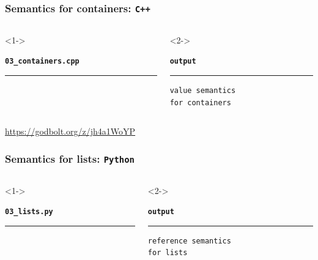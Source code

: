 \documentclass[aspectratio=169]{beamer}
\newcommand{\cpp}[1]{\texttt{\textbf{\textcolor{clCodeBlue}{#1}}}}
\begin{document}
\begin{frame}[fragile]
\frametitle{Semantics for containers: \cpp{C++}}
\begin{columns}[T]
  \begin{column}{0.7\textwidth}<1->
    {\color[HTML]{cb4b16}
    \texttt{\textbf{03\_containers.cpp}}\vspace{-9pt}
    \rule{\linewidth}{2pt}}%
    {\fontsize{8}{6} }%
    \vspace{-12pt}{\color[HTML]{cb4b16}\rule{\linewidth}{2pt}}%
  \end{column}
  \begin{column}{0.25\textwidth}<2->
    {\color[HTML]{002b36}
    \texttt{\textbf{output}}\vspace{-9pt}
    \rule{\linewidth}{2pt}}%
    {\fontsize{8}{6} \begin{lstlisting}[showstringspaces=false]
value semantics
for containers
    \end{lstlisting}
    }
    \vspace{-12pt}{\color[HTML]{002b36}\rule{\linewidth}{2pt}}%
  \end{column}
\end{columns}
\pause{}
\begin{center}\url{https://godbolt.org/z/jh4a1WoYP}\end{center}
\end{frame}

\begin{frame}[fragile]
\frametitle{Semantics for lists: \cpp{Python}}
\begin{columns}[T]
  \begin{column}{0.7\textwidth}<1->
    {\color[HTML]{b58900}
    \texttt{\textbf{03\_lists.py}}\vspace{-9pt}
    \rule{\linewidth}{2pt}}%
    {\fontsize{8}{6} }%
    \vspace{-12pt}{\color[HTML]{b58900}\rule{\linewidth}{2pt}}%
  \end{column}
  \begin{column}{0.25\textwidth}<2->
    {\color[HTML]{002b36}
    \texttt{\textbf{output}}\vspace{-9pt}
    \rule{\linewidth}{2pt}}%
    {\fontsize{8}{6} \begin{lstlisting}[showstringspaces=false]
reference semantics
for lists
    \end{lstlisting}
    }
    \vspace{-12pt}{\color[HTML]{002b36}\rule{\linewidth}{2pt}}%
  \end{column}
\end{columns}
\end{frame}
\end{document}
